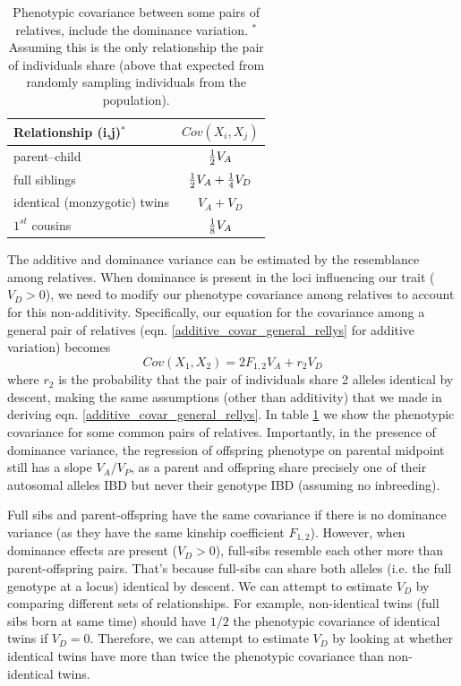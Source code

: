 \begin{table}
\begin{center}
\begin{tabular}{| l | c|}
\hline
Relationship (i,j)$^{*}$ &  $Cov(X_i,X_j)$  \\
\hline
parent--child & $\nicefrac{1}{2} V_A$\\
full siblings &$\nicefrac{1}{2} V_A +\nicefrac{1}{4} V_D$\\
identical (monzygotic) twins & $V_A+V_D$ \\
$1^{st}$ cousins & $\nicefrac{1}{8} V_A$\\
\hline
\end{tabular}
\end{center}
\caption{Phenotypic covariance between some pairs of relatives,
  include the dominance variation. $^{*}$Assuming this is the only relationship
the pair of individuals share (above that expected from randomly
sampling individuals from the population). } %
\label{table:domcovar}
\end{table}

The additive and dominance variance can be estimated by the
resemblance among relatives. 
When dominance is present in the loci influencing our trait ($V_D>0$), we need to modify our
phenotype covariance among relatives to account for this
non-additivity. Specifically, our equation for the covariance among a
general pair of relatives
(eqn. \ref{additive_covar_general_rellys} for additive variation) becomes
\begin{equation}
 Cov(X_1,X_2) = 2 F_{1,2} V_A + r_2 V_D \label{eqn:relly_covar_add_dom}
\end{equation}
where $r_2$ is the probability that the pair of individuals share 2
alleles identical by descent, making the same assumptions (other than additivity) that we made in deriving
eqn. \ref{additive_covar_general_rellys}.  In table
\ref{table:domcovar} we show the phenotypic covariance for some common
pairs of relatives. Importantly, in the presence of dominance variance, the regression of offspring phenotype on parental
midpoint still has a slope $V_A/V_P$, as a parent and offspring share
precisely one of their autosomal  alleles IBD but never their genotype IBD (assuming no inbreeding).

Full sibs and parent-offspring have the same
covariance if there is no dominance variance (as they have the same
kinship coefficient $F_{1,2}$). However, when dominance
effects are present ($V_D>0$), full-sibs resemble each other more than
parent-offspring pairs. That's because full-sibs can share both alleles (i.e. the
full genotype at a locus) identical by descent. We can attempt to
estimate $V_D$ by comparing different sets of relationships. For
example, non-identical twins (full sibs born at same time) 
should have $1/2$ the phenotypic covariance of identical twins if
$V_D=0$. Therefore, we can attempt to estimate $V_D$ by looking at
whether identical twins have more than twice the phenotypic covariance
than non-identical twins. \\

